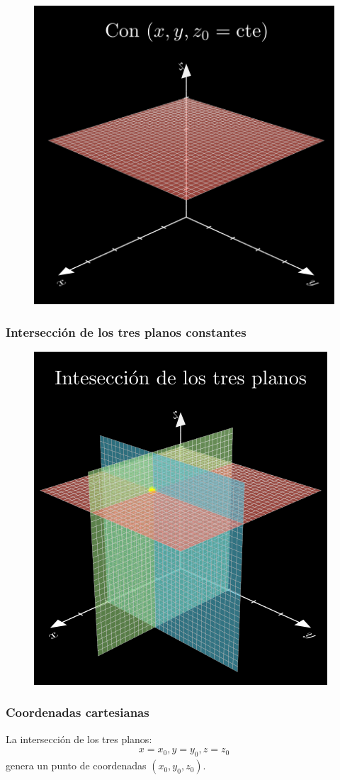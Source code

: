 \documentclass[12pt]{beamer}
\begin{document}
{\begin{frame}
\begin{figure}[H]
   \centering
   \includegraphics[width=0.6\linewidth]{Imagenes/superficies_03_plano_z.png}
   \label{fig:plano_z}
\end{figure}
\end{frame}
\begin{frame}
\frametitle{Intersección de los tres planos constantes}
\begin{figure}[H]
   \centering
   \includegraphics[width=0.6\linewidth]{Imagenes/superficies_04_tres_planos.png}
   \label{fig:tresplanos}
\end{figure}
\end{frame}
}
\begin{frame}
\frametitle{Coordenadas cartesianas}
La intersección de los tres planos:
\begin{align*}
x = x_{0}, y = y_{0}, z = z_{0}   
\end{align*}
genera un punto de coordenadas $(x_{0}, y_{0}, z_{0})$.
\end{frame}
\end{document}
